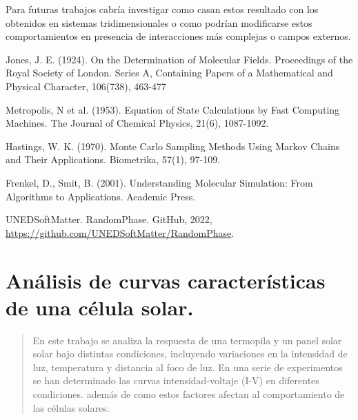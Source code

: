 Para futuras trabajos cabría investigar como  casan estos resultado con los obtenidos en sistemas tridimensionales o  como podrían modificarse estos comportamientos en presencia de interacciones más complejas o campos externos.


\begin{thebibliography}{99}
	
Jones, J. E. (1924). On the Determination of Molecular Fields. Proceedings of the Royal Society of London. Series A, Containing Papers of a Mathematical and Physical Character, 106(738), 463-477


Metropolis, N et al. (1953). Equation of State Calculations by Fast Computing Machines. The Journal of Chemical Physics, 21(6), 1087-1092.

Hastings, W. K. (1970). Monte Carlo Sampling Methods Using Markov Chains and Their Applications. Biometrika, 57(1), 97-109.

Frenkel, D., Smit, B. (2001). Understanding Molecular Simulation: From Algorithms to Applications. Academic Press.

UNEDSoftMatter. RandomPhase. GitHub, 2022, \url{https://github.com/UNEDSoftMatter/RandomPhase}.




\end{thebibliography}
\newpage


\titleformat{\chapter}[display]
{\normalfont\bfseries}{}{0pt}{\LARGE}

\chapter{Análisis de curvas características de una célula solar.}
\begin{abstract}
	\vspace{\baselineskip}
	\footnotesize
	En este trabajo se analiza la respuesta de una termopila y un panel solar solar bajo distintas condiciones, incluyendo variaciones en la intensidad de luz, temperatura y distancia al foco de luz. En una serie de experimentos se han determinado las curvas intensidad-voltaje (I-V) en diferentes condiciones. además de como estos factores afectan al comportamiento de las células solares.
	
\end{abstract}
